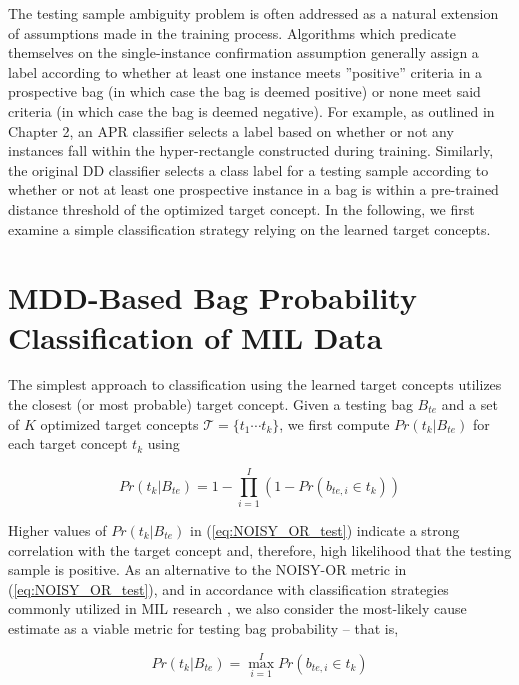 \documentclass[12pt,dvips]{report}
\numberwithin{equation}{section}
\begin{document}
The testing sample ambiguity problem is often addressed as a natural extension of assumptions made in the training process.  Algorithms which predicate themselves on the single-instance confirmation assumption generally assign a label according to whether at least one instance meets ''positive'' criteria in a prospective bag (in which case the bag is deemed positive) or none meet said criteria (in which case the bag is deemed negative).  For example, as outlined in Chapter 2, an APR classifier \cite{diet97} selects a label based on whether or not any instances fall within the hyper-rectangle constructed during training.  Similarly, the original DD classifier \cite{maro98} selects a class label for a testing sample according to whether or not at least one prospective instance in a bag is within a pre-trained distance threshold of the optimized target concept.  In the following, we first examine a simple classification strategy relying on the learned target concepts.

\section{MDD-Based Bag Probability Classification of MIL Data} %

The simplest approach to classification using the learned target concepts utilizes the closest (or most probable) target concept.  Given a testing bag $B_{te}$ and a set of $K$ optimized target concepts $\mathcal{T}=\{t_1 \cdots t_k\}$, we first compute $Pr(t_k\vert B_{te})$ for each target concept $t_k$ using

\begin{equation} \label{eq:NOISY_OR_test}
Pr(t_{k}\vert B_{te})=1\!\!-\!\!\prod_{i=1}^{I}(1\!\!-\!\!Pr(b_{te,i}\!\in \!\!t_{k})) 
\end{equation}

Higher values of $Pr(t_k\vert B_{te})$ in (\ref{eq:NOISY_OR_test}) indicate a strong correlation with the target concept and, therefore, high likelihood that the testing sample is positive.  As an alternative to the NOISY-OR metric in (\ref{eq:NOISY_OR_test}), and in accordance with classification strategies commonly utilized in MIL research \cite{amor13,maro98}, we also consider the most-likely cause estimate as a viable metric for testing bag probability -- that is,  

\begin{equation} \label{eq:MLCE_test}
Pr(t_{k}\vert B_{te})=\max_{i=1}^{I}Pr(b_{te,i}\!\in\!\!t_{k})
\end{equation}
\end{document}
